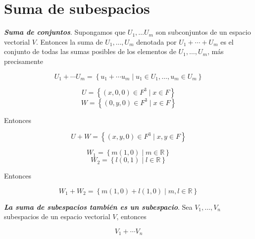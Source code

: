 \documentclass{report}
\begin{document}
    \section{Suma de subespacios}
    
    \begin{defBox}
        \textit{\textbf{Suma de conjuntos}}. Supongamos que $U_1, \dots U_m$ son subconjuntos de un espacio vectorial $V$. Entonces la suma de $U_1, \dots , U_m$ denotada por $U_1 + \cdots + U_m $ es el conjunto de todas las sumas posibles de los elementos de $U_1, \dots , U_m$, más precisamente
        
        $$U_1 + \cdots U_m = \left\{ u_1 + \cdots u_m \mid u_1 \in U_1 , \dots , u_m \in U_m \right\}$$
    \end{defBox}
    
    \begin{Example}
        $$U = \left\{ (x, 0, 0) \in F^3 \mid x \in F \right\}$$
        $$W = \left\{ (0, y, 0) \in F^3 \mid x \in F \right\}$$

        Entonces

        $$U + W = \left\{ (x, y, 0) \in F^3 \mid x, y \in F \right\}$$
    \end{Example}

    \begin{Example}
        $$W_1 = \left\{ m(1,0) \mid m \in \mathbb{R} \right\}$$
        $$W_2 = \left\{ l(0,1) \mid l \in \mathbb{R} \right\}$$

        Entonces

        $$W_1 + W_2 = \left\{ m(1,0) + l(1,0) \mid m, l \in \mathbb{R} \right\}$$
    \end{Example}
    
    \begin{thBox}
        \textit{\textbf{La suma de subespacios también es un subespacio}}. Sea $V_1, \dots , V_n$ subespacios de un espacio vectorial $V$, entonces
        
        $$ V_1 + \cdots V_n $$
    \end{thBox}
    

\end{document}
